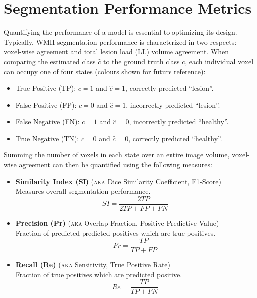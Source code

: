 \section{Segmentation Performance Metrics}\label{ss:metrics}
Quantifying the performance of a model is essential to optimizing its design.
Typically, WMH segmentation performance is characterized in two respects: voxel-wise agreement and total lesion load (LL) volume agreement.
When comparing the estimated class $\hat{c}$ to the ground truth class $c$, each individual voxel can occupy one of four states (colours shown for future reference):
\begin{itemize}[itemsep=0pt,topsep=0pt]
  \item[\textcolor{green}{\scalebox{0.7}{$\blacksquare$}}] True Positive (TP): $c = 1$ and $\hat{c} = 1$, correctly predicted ``lesion''.
  \item[\textcolor{red}  {\scalebox{0.7}{$\blacksquare$}}] False Positive (FP): $c = 0$ and $\hat{c} = 1$, incorrectly predicted ``lesion''.
  \item[\textcolor{blue} {\scalebox{0.7}{$\blacksquare$}}] False Negative (FN): $c = 1$ and $\hat{c} = 0$, incorrectly predicted ``healthy''.
  \item[\textcolor{black}{\scalebox{0.7}{$\blacksquare$}}] True Negative (TN): $c = 0$ and $\hat{c} = 0$, correctly predicted ``healthy''.
\end{itemize}
Summing the number of voxels in each state over an entire image volume, voxel-wise agreement can then be quantified using the following measures:
\begin{itemize}
  \item \textbf{Similarity Index (SI)}
  (\textsc{aka} Dice Similarity Coefficient, F1-Score)\\
  Measures overall segmentation performance.
  \begin{equation}SI = \dfrac{2TP}{2TP + FP + FN}\end{equation}
  \item \textbf{Precision (Pr)}
  (\textsc{aka} Overlap Fraction, Positive Predictive Value)\\
  Fraction of predicted predicted positives which are true positives.
  \begin{equation}Pr = \dfrac{TP}{TP+FP}\end{equation}
  \item \textbf{Recall (Re)}
  (\textsc{aka} Sensitivity, True Positive Rate)\\
  Fraction of true positives which are predicted positive.
  \begin{equation}Re = \dfrac{TP}{TP+FN}\end{equation}
\end{itemize}
